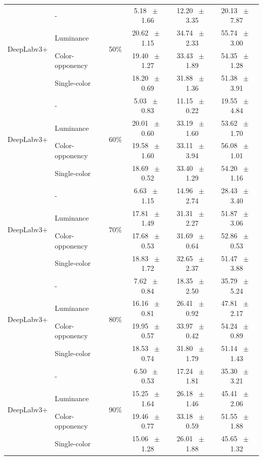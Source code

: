 \begin{table}[h]
\begin{tabular}{@{}l l c c c c@{}}
    \multirow{4}{*}{DeepLabv3+} & - & \multirow{4}{*}{50\%} & 5.18 ~$\pm$~ 1.66 & 12.20 ~$\pm$~ 3.35 & 20.13 ~$\pm$~ 7.87 \\
    & Luminance &  & 20.62 ~$\pm$~ 1.15 & 34.74 ~$\pm$~ 2.33 & 55.74 ~$\pm$~ 3.00 \\
    & Color-opponency &  & 19.40 ~$\pm$~ 1.27 & 33.43 ~$\pm$~ 1.89 & 54.35 ~$\pm$~ 1.28 \\
    & Single-color &  & 18.20 ~$\pm$~ 0.69 & 31.88 ~$\pm$~ 1.36 & 51.38 ~$\pm$~ 3.91 \\
    \midrule
    \multirow{4}{*}{DeepLabv3+} & - & \multirow{4}{*}{60\%} & 5.03 ~$\pm$~ 0.83 & 11.15 ~$\pm$~ 0.22 & 19.55 ~$\pm$~ 4.84 \\
    & Luminance &  & 20.01 ~$\pm$~ 0.60 & 33.19 ~$\pm$~ 1.60 & 53.62 ~$\pm$~ 1.70 \\
    & Color-opponency &  & 19.58 ~$\pm$~ 1.60 & 33.11 ~$\pm$~ 3.94 & 56.08 ~$\pm$~ 1.01 \\
    & Single-color &  & 18.69 ~$\pm$~ 0.52 & 33.40 ~$\pm$~ 1.29 & 54.20 ~$\pm$~ 1.16 \\
    \midrule
    \multirow{4}{*}{DeepLabv3+} & - & \multirow{4}{*}{70\%} & 6.63 ~$\pm$~ 1.15 & 14.96 ~$\pm$~ 2.74 & 28.43 ~$\pm$~ 3.40 \\
    & Luminance &  & 17.81 ~$\pm$~ 1.49 & 31.31 ~$\pm$~ 2.27 & 51.87 ~$\pm$~ 3.06 \\
    & Color-opponency &  & 17.68 ~$\pm$~ 0.53 & 31.69 ~$\pm$~ 0.64 & 52.86 ~$\pm$~ 0.53 \\
    & Single-color &  & 18.83 ~$\pm$~ 1.72 & 32.65 ~$\pm$~ 2.37 & 51.47 ~$\pm$~ 3.88 \\
    \midrule
    \multirow{4}{*}{DeepLabv3+} & - & \multirow{4}{*}{80\%} & 7.62 ~$\pm$~ 0.84 & 18.35 ~$\pm$~ 2.50 & 35.79 ~$\pm$~ 5.24 \\
    & Luminance &  & 16.16 ~$\pm$~ 0.81 & 26.41 ~$\pm$~ 0.92 & 47.81 ~$\pm$~ 2.17 \\
    & Color-opponency &  & 19.95 ~$\pm$~ 0.57 & 33.97 ~$\pm$~ 0.42 & 54.24 ~$\pm$~ 0.89 \\
    & Single-color &  & 18.53 ~$\pm$~ 0.74 & 31.80 ~$\pm$~ 1.79 & 51.14 ~$\pm$~ 1.43 \\
    \midrule
    \multirow{4}{*}{DeepLabv3+} & - & \multirow{4}{*}{90\%} & 6.50 ~$\pm$~ 0.53 & 17.24 ~$\pm$~ 1.81 & 35.30 ~$\pm$~ 3.21 \\
    & Luminance &  & 15.25 ~$\pm$~ 1.64 & 26.18 ~$\pm$~ 1.46 & 45.41 ~$\pm$~ 2.06 \\
    & Color-opponency &  & 19.46 ~$\pm$~ 0.77 & 33.18 ~$\pm$~ 0.59 & 51.55 ~$\pm$~ 1.88 \\
    & Single-color &  & 15.06 ~$\pm$~ 1.28 & 26.01 ~$\pm$~ 1.88 & 45.65 ~$\pm$~ 1.32 \\
    \midrule
    \bottomrule
  \end{tabular}
  \label{tab:deeplabv3plus_dark_zurich}
\end{table}